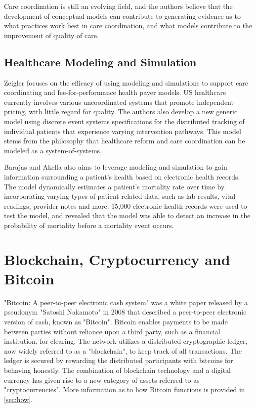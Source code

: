 \documentclass[12pt]{report}
\begin{document}
Care coordination is still an evolving field, and the authors believe that the development of conceptual models can contribute to generating evidence as to what practices work best in care coordination, and what models contribute to the improvement of quality of care.

\subsection{Healthcare Modeling and Simulation}
Zeigler \cite{Zeigler.2014} focuses on the efficacy of using modeling and simulations to support care coordinating and fee-for-performance health payer models. US healthcare currently involves various uncoordinated systems that promote independent pricing, with little regard for quality. The authors also develop a new generic model using discrete event systems specifications for the distributed tracking of individual patients that experience varying intervention pathways. This model stems from the philosophy that healthcare reform and care coordination can be modeled as a system-of-systems.

Barajas and Akella \cite{CaballeroBarajas.2015} also aims to leverage modeling and simulation to gain information surrounding a patient's health based on electronic health records. The model dynamically estimates a patient's mortality rate over time by incorporating varying types of patient related data, such as lab results, vital readings, provider notes and more. 15,000 electronic health records were used to test the model, and revealed that the model was able to detect an increase in the probability of mortality before a mortality event occurs.


\section{Blockchain, Cryptocurrency and Bitcoin}
"Bitcoin: A peer-to-peer electronic cash system" \cite{Nakamoto.2008} was a white paper released by a pseudonym "Satoshi Nakamoto" in 2008 that described a peer-to-peer electronic version of cash, known as "Bitcoin". Bitcoin enables payments to be made between parties without reliance upon a third party, such as a financial institution, for clearing. The network utilizes a distributed cryptographic ledger, now widely referred to as a "blockchain", to keep track of all transactions. The ledger is secured by rewarding the distributed participants with bitcoins for behaving honestly. The combination of blockchain technology and a digital currency has given rise to a new category of assets referred to as "cryptocurrencies". More information as to how Bitcoin functions is provided in \autoref{sec:how}.
\end{document}
